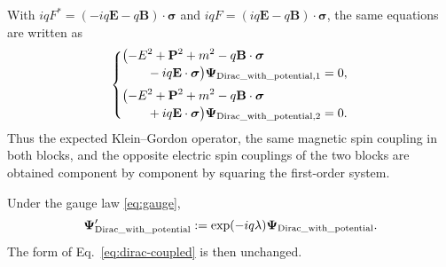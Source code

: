 \documentclass[10pt,letterpaper]{article}
\let\STAamsmathtext\text
\newcommand{\eqtext}[1]{\STAamsmathtext{\normalfont\rmfamily #1}}
\renewcommand{\text}[1]{\STAamsmathtext{\normalfont\rmfamily #1}}
\newcommand{\pv}[1]{#1}
\newcommand{\vct}[1]{\mathbf{#1}}
\newcommand{\sigv}{\vct{\pv{\bm{\sigma}}}}
\newcommand{\bPsi}{\pv{\bm{\Psi}}}
\newcommand{\conj}[1]{#1^{*}}
\begin{document}
With
\(iq\conj{\pv{F}}=(-iq\vct{E}-q\vct{B})\cdot\sigv\) and
\(iq\pv{F}=(iq\vct{E}-q\vct{B})\cdot\sigv\), the same equations are written as
\begin{equation}
\left\{
\begin{aligned}
&\bigl(-E^2+\vct{P}^2+m^2
-q\vct{B}\cdot\sigv\\[-0.2em]
&\qquad-iq\vct{E}\cdot\sigv\bigr)
\bPsi_{\eqtext{Dirac\_with\_potential},1}=0,\\[2pt]
&\bigl(-E^2+\vct{P}^2+m^2
-q\vct{B}\cdot\sigv\\[-0.2em]
&\qquad+iq\vct{E}\cdot\sigv\bigr)
\bPsi_{\eqtext{Dirac\_with\_potential},2}=0.
\end{aligned}
\right.
\label{eq:dirac-square-components}
\end{equation}
Thus the expected Klein--Gordon operator, the same magnetic spin coupling in
both blocks, and the opposite electric spin couplings of the two blocks are
obtained component by component by squaring the first-order system.

Under the gauge law \eqref{eq:gauge},
\begin{equation}
\bPsi_{\eqtext{Dirac\_with\_potential}}'
:=\exp(-iq\lambda)\bPsi_{\eqtext{Dirac\_with\_potential}}.
\label{eq:dirac-gauge}
\end{equation}
The form of Eq.\ \eqref{eq:dirac-coupled} is then unchanged.
\end{document}
